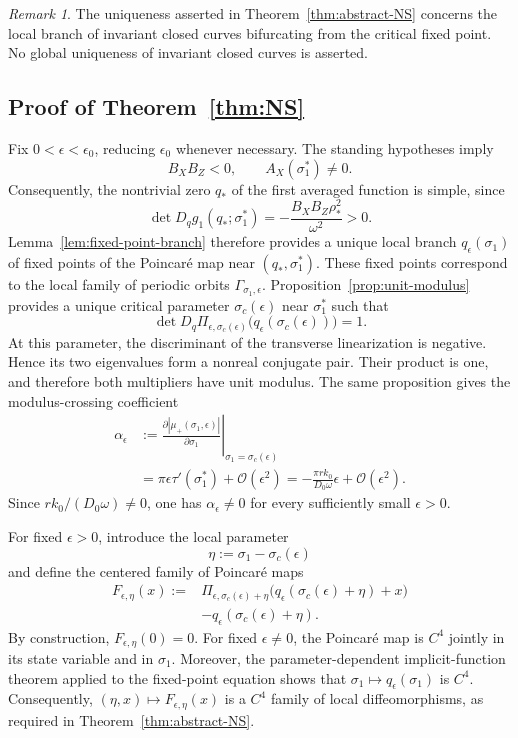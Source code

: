 \documentclass[11pt]{amsart}
\theoremstyle{remark}
\newtheorem{remark}[theorem]{Remark}
\newcommand{\cO}{\mathcal{O}}
\begin{document}
\begin{remark}
The uniqueness asserted in Theorem~\ref{thm:abstract-NS} concerns the local
branch of invariant closed curves bifurcating from the critical fixed point.
No global uniqueness of invariant closed curves is asserted.
\end{remark}

\subsection{Proof of Theorem~\ref{thm:NS}}

Fix \(0<\epsilon<\epsilon_0\), reducing \(\epsilon_0\) whenever necessary.
The standing hypotheses imply
\[
 B_XB_Z<0,\qquad A_X(\sigma_1^*)\ne0.
\]
Consequently, the nontrivial zero \(q_*\) of the first averaged function is
simple, since
\[
 \det D_qg_1(q_*;\sigma_1^*)
=-\frac{B_XB_Z\rho_*^2}{\omega^2}>0.
\]
Lemma~\ref{lem:fixed-point-branch} therefore provides a unique local branch
\(q_\epsilon(\sigma_1)\) of fixed points of the Poincar\'e map near
\((q_*,\sigma_1^*)\).  These fixed points correspond to the local family of
periodic orbits \(\Gamma_{\sigma_1,\epsilon}\).
Proposition~\ref{prop:unit-modulus} provides a unique critical parameter
\(\sigma_c(\epsilon)\) near \(\sigma_1^*\) such that
\[
 \det D_q\Pi_{\epsilon,\sigma_c(\epsilon)}
\bigl(q_\epsilon(\sigma_c(\epsilon))\bigr)=1.
\]
At this parameter, the discriminant of the transverse linearization is
negative.  Hence its two eigenvalues form a nonreal conjugate pair.  Their
product is one, and therefore both multipliers have unit modulus.  The same
proposition gives the modulus-crossing coefficient
\begin{equation}\label{eq:alpha}
\begin{aligned}
\alpha_\epsilon
&:=
\left.
\frac{\partial|\mu_+(\sigma_1,\epsilon)|}{\partial\sigma_1}
\right|_{\sigma_1=\sigma_c(\epsilon)}\\
&=\pi\epsilon\tau'(\sigma_1^*)+\cO(\epsilon^2)
=-\frac{\pi rk_0}{D_0\omega}\epsilon+\cO(\epsilon^2).
\end{aligned}
\end{equation}
Since \(rk_0/(D_0\omega)\ne0\), one has
\(\alpha_\epsilon\ne0\) for every sufficiently small \(\epsilon>0\).

For fixed \(\epsilon>0\), introduce the local parameter
\[
 \eta:=\sigma_1-\sigma_c(\epsilon)
\]
and define the centered family of Poincar\'e maps
\[
\begin{aligned}
F_{\epsilon,\eta}(x)
:={}&\Pi_{\epsilon,\sigma_c(\epsilon)+\eta}
\bigl(q_\epsilon(\sigma_c(\epsilon)+\eta)+x\bigr)\\
&-q_\epsilon(\sigma_c(\epsilon)+\eta).
\end{aligned}
\]
By construction, \(F_{\epsilon,\eta}(0)=0\).  For fixed
\(\epsilon\ne0\), the Poincar\'e map is \(C^4\) jointly in its state variable
and in \(\sigma_1\).  Moreover, the parameter-dependent implicit-function
theorem applied to the fixed-point equation shows that
\(\sigma_1\mapsto q_\epsilon(\sigma_1)\) is \(C^4\).  Consequently,
\((\eta,x)\mapsto F_{\epsilon,\eta}(x)\) is a \(C^4\) family of local
diffeomorphisms, as required in Theorem~\ref{thm:abstract-NS}.
\end{document}
